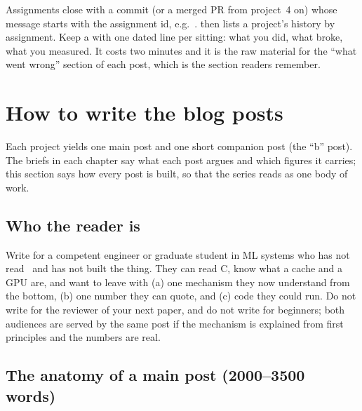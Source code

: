 Assignments close with a commit (or a merged PR from project~4 on) whose message starts with the assignment id, e.g.\ .  then lists a project's history by assignment. Keep a  with one dated line per sitting: what you did, what broke, what you measured. It costs two minutes and it is the raw material for the ``what went wrong'' section of each post, which is the section readers remember.

\section{How to write the blog posts}
\label{sec:blogguide}

Each project yields one main post and one short companion post (the ``b'' post). The briefs in each chapter say what each post argues and which figures it carries; this section says how every post is built, so that the series reads as one body of work.

\subsection{Who the reader is}

Write for a competent engineer or graduate student in ML systems who has not read \csapp\ and has not built the thing. They can read C, know what a cache and a GPU are, and want to leave with (a) one mechanism they now understand from the bottom, (b) one number they can quote, and (c) code they could run. Do not write for the reviewer of your next paper, and do not write for beginners; both audiences are served by the same post if the mechanism is explained from first principles and the numbers are real.

\subsection{The anatomy of a main post (2000--3500 words)}

